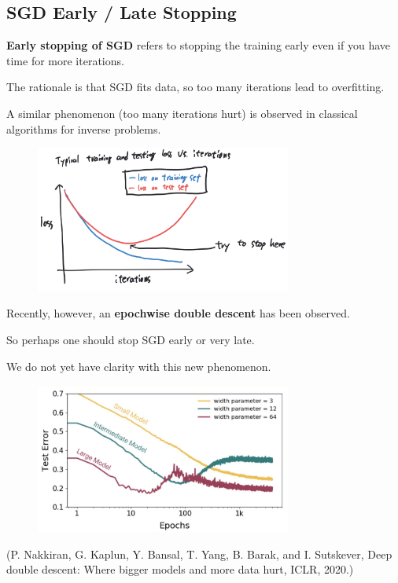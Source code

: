 \subsection{SGD Early / Late Stopping}

\begin{definition}
    \textbf{Early stopping of SGD} refers to stopping the training early even if you have time for more iterations.

    The rationale is that SGD fits data, so too many iterations lead to overfitting.

    A similar phenomenon (too many iterations hurt) is observed in classical algorithms for inverse problems.

    \begin{figure}[H]
        \centering
        \includegraphics[width=0.75\textwidth]{.././assets/6.7.png}
    \end{figure}
\end{definition}

\begin{definition}
    Recently, however, an \textbf{epochwise double descent} has been observed.

    So perhaps one should stop SGD early or very late.

    We do not yet have clarity with this new phenomenon.

    \begin{figure}[H]
        \centering
        \includegraphics[width=0.75\textwidth]{.././assets/6.8.jpg}
    \end{figure}

    (P. Nakkiran, G. Kaplun, Y. Bansal, T. Yang, B. Barak, and I. Sutskever, Deep double descent: Where bigger models and more data hurt, ICLR, 2020.)
\end{definition}

